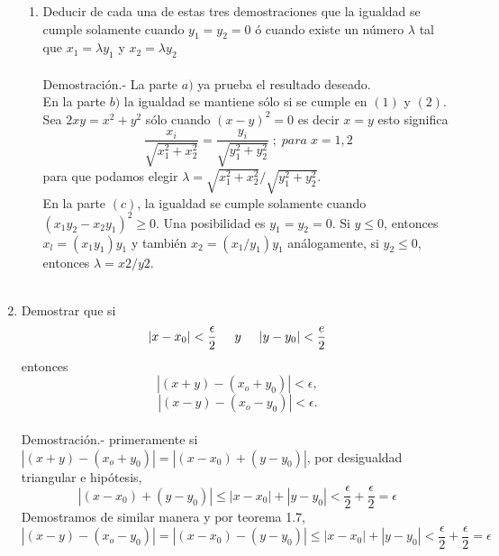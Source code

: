 \begin{enumerate}[\bfseries 1.]
\begin{enumerate}[\bfseries (a)]
\item Deducir de cada una de estas tres demostraciones que la igualdad se cumple solamente cuando $y_1 = y_2 = 0$ ó cuando existe un número $\lambda$ tal que $x_1=\lambda y_1$\; y \; $x_2= \lambda y_2$\\\\
Demostración.- \; La parte $a)$ ya prueba el resultado deseado.\\
En la parte $b)$ la igualdad se mantiene sólo si se cumple en $(1)$ y $(2)$. Sea $2xy=x^2+y^2$ sólo cuando $(x-y)^2=0$ es decir $x=y$ esto significa $$\dfrac{x_i}{\sqrt{x_1^2 + x_2^2}}= \dfrac{y_i}{\sqrt{y_1^2+y_2^2}} \; ; \; para \; x=1,2$$ para que podamos elegir $\lambda = \sqrt{x_1^2 + x_2^2} / \sqrt{y_1^2 + y_2^2}$.\\
En la parte $(c)$, la igualdad se cumple solamente cuando $(x_1 y_2 - x_2 y_1)^2 \geq 0$. Una posibilidad es $y_1 = y_2 = 0$. Si $y\leq 0$, entonces $x_l = (x_1 y_1)y_1$ \; y también $x_2 = (x_1 / y_1)y_1$ análogamente, si $y_2\leq 0$, entonces $\lambda = x2/y2$.\\\\
\end{enumerate}

\item Demostrar que si $$|x - x_0|<\dfrac{\epsilon}{2} \hspace{0.5cm} y \hspace{0.5cm} |y - y_0|<\dfrac{e}{2}$$ entonces $$|(x+y)-(x_o + y_0)|<\epsilon,$$ $$|(x-y)-(x_o - y_0)|<\epsilon.$$\\
Demostración.- \; primeramente si $|(x+y)-(x_o + y_0)|= |(x-x_0)+(y-y_0)|$, por desigualdad triangular e hipótesis, $$ |(x-x_0)+(y-y_0)|\leq |x - x_0| + |y - y_0| <\frac{\epsilon}{2} + \frac{\epsilon}{2} =\epsilon$$
Demostramos de similar manera y por teorema 1.7, $$|(x-y)-(x_o - y_0)| = |(x - x_0)-(y - y_0)| \leq |x - x_0| + |y - y_0|< \frac{\epsilon}{2} + \frac{\epsilon}{2}=\epsilon$$\\


\end{enumerate}
